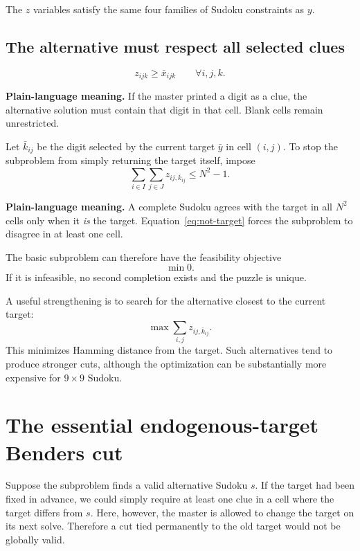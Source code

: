 \documentclass[11pt]{article}
\newcommand{\alt}{z}
\begin{document}
The $z$ variables satisfy the same four families of Sudoku constraints as $y$.

\subsection{The alternative must respect all selected clues}

\begin{equation}
\alt_{ijk}\ge \bar x_{ijk}
\qquad \forall i,j,k.
\label{eq:respect-clues}
\end{equation}

\textbf{Plain-language meaning.} If the master printed a digit as a clue, the alternative solution must contain that digit in that cell. Blank cells remain unrestricted.

Let $\bar k_{ij}$ be the digit selected by the current target $\bar y$ in cell $(i,j)$. To stop the subproblem from simply returning the target itself, impose
\begin{equation}
\sum_{i\in I}\sum_{j\in J}\alt_{ij,\bar k_{ij}}
\le N^2-1.
\label{eq:not-target}
\end{equation}

\textbf{Plain-language meaning.} A complete Sudoku agrees with the target in all $N^2$ cells only when it \emph{is} the target. Equation~\eqref{eq:not-target} forces the subproblem to disagree in at least one cell.

The basic subproblem can therefore have the feasibility objective
\[
\min 0.
\]
If it is infeasible, no second completion exists and the puzzle is unique.

A useful strengthening is to search for the alternative closest to the current target:
\begin{equation}
\max \sum_{i,j}\alt_{ij,\bar k_{ij}}.
\label{eq:closest}
\end{equation}
This minimizes Hamming distance from the target. Such alternatives tend to produce stronger cuts, although the optimization can be substantially more expensive for $9\times9$ Sudoku.

\section{The essential endogenous-target Benders cut}

Suppose the subproblem finds a valid alternative Sudoku $s$. If the target had been fixed in advance, we could simply require at least one clue in a cell where the target differs from $s$. Here, however, the master is allowed to change the target on its next solve. Therefore a cut tied permanently to the old target would not be globally valid.
\end{document}

